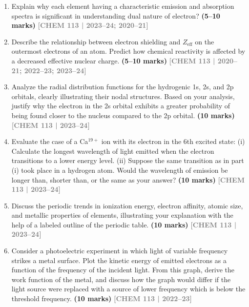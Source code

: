 \documentclass[12pt,a3paper]{article}
\newcommand{\yr}[1]{\hfill\textcolor{gray}{\small\textbf{[#1]}}}
\newcommand{\mk}[1]{\textcolor{orange!70!black}{\small\textbf{(#1 marks)}}}
\begin{document}
\begin{enumerate}
\item Explain why each element having a characteristic emission and absorption spectra is significant in understanding dual nature of electron? \mk{5--10}
\yr{CHEM 113 | 2023--24; 2020--21}



\item Describe the relationship between electron shielding and $Z_{\text{eff}}$ on the outermost electrons of an atom. Predict how chemical reactivity is affected by a decreased effective nuclear charge. \mk{5--10}
\yr{CHEM 113 | 2020--21; 2022--23; 2023--24}



\item Analyze the radial distribution functions for the hydrogenic 1s, 2s, and 2p orbitals, clearly illustrating their nodal structures. Based on your analysis, justify why the electron in the 2s orbital exhibits a greater probability of being found closer to the nucleus compared to the 2p orbital. \mk{10}
\yr{CHEM 113 | 2023--24}





\item Evaluate the case of a Ca$^{19+}$ ion with its electron in the 6th excited state: (i) Calculate the longest wavelength of light emitted when the electron transitions to a lower energy level. (ii) Suppose the same transition as in part (i) took place in a hydrogen atom. Would the wavelength of emission be longer than, shorter than, or the same as your answer? \mk{10}
\yr{CHEM 113 | 2023--24}



\item Discuss the periodic trends in ionization energy, electron affinity, atomic size, and metallic properties of elements, illustrating your explanation with the help of a labeled outline of the periodic table. \mk{10}
\yr{CHEM 113 | 2023--24}




\item Consider a photoelectric experiment in which light of variable frequency strikes a metal surface. Plot the kinetic energy of emitted electrons as a function of the frequency of the incident light. From this graph, derive the work function of the metal, and discuss how the graph would differ if the light source were replaced with a source of lower frequency which is below the threshold frequency. \mk{10}
\yr{CHEM 113 | 2022--23}




\end{enumerate}
\end{document}
